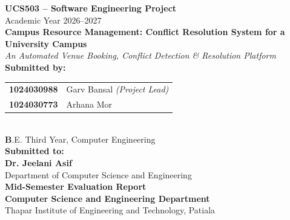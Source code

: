 \documentclass[12pt, a4paper, oneside]{report}
\begin{document}
\begin{titlepage}
    \centering
    \vspace*{0.5cm}
    
    {\Large\bfseries UCS503 -- Software Engineering Project}\\[0.3cm]
    {\large Academic Year 2026--2027}\\[1.5cm]
    
    {\Huge\bfseries Campus Resource Management: Conflict Resolution System for a University Campus}\\[0.4cm]
    {\large\textit{An Automated Venue Booking, Conflict Detection \& Resolution Platform}}\\[2.0cm]
    
    {\large\textbf{Submitted by:}}\\[0.3cm]
    \begin{tabular}{ll}
        \textbf{1024030988} & Garv Bansal \textit{(Project Lead)} \\
        \textbf{1024030773} & Arhana Mor \\
    \end{tabular}\\[0.5cm]
    {\normalsize\textbf B.E. Third Year, Computer Engineering}\\[1.6cm]
    
    {\large\textbf{Submitted to:}}\\[0.2cm]
    {\large\textbf{Dr. Jeelani Asif}}\\[0.1cm]
    {\normalsize Department of Computer Science and Engineering}\\[1.2cm]
    
    \vfill
    {\normalsize\textbf{Mid-Semester Evaluation Report}}\\[0.15cm]
    {\normalsize\textbf{Computer Science and Engineering Department}}\\[0.1cm]
    {\normalsize Thapar Institute of Engineering and Technology, Patiala}\\[0.4cm]
\end{titlepage}

\tableofcontents
\newpage
{}

\end{document}

